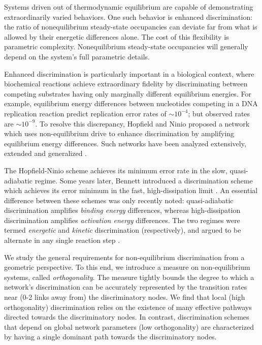 Systems driven out of thermodynamic equilibrium are capable of demonstrating extraordinarily varied behaviors.  One such behavior is enhanced discrimination: the ratio of nonequilibrium steady-state occupancies can deviate far from what is allowed by their energetic differences alone.  The cost of this flexibility is parametric complexity.  Nonequilibrium steady-state occupancies will generally depend on the system's full parametric details.

Enhanced discrimination is particularly important in a biological context, where biochemical reactions achieve extraordinary fidelity by discriminating between competing substrates having only marginally different equilibrium energies.  For example, equilibrium energy differences between nucleotides competing in a DNA replication reaction predict replication error rates of $\sim10^{-4}$; but observed rates are $\sim10^{-9}$.  To resolve this discrepancy, Hopfield \cite{Hopfield1974} and Ninio \cite{Ninio1975} proposed a network which uses non-equilibrium drive to enhance discrimination by amplifying equilibrium energy differences.  Such networks have been analyzed extensively, extended \cite{Ehrenberg1980,Murugan2012} and generalized \cite{Murugan2014}.

The Hopfield-Ninio scheme achieves its minimum error rate in the slow, quasi-adiabatic regime.  Some years later, Bennett introduced a discrimination scheme which achieves its error minimum in the fast, high-dissipation limit \cite{Bennett1979,Bennett1982}.  An essential difference between these schemes was only recently noted: quasi-adiabatic discrimination amplifies {\it binding energy} differences, whereas high-dissipation discrimination amplifies {\it activation energy} differences.  The two regimes were termed {\it energetic} and {\it kinetic} discrimination (respectively), and argued to be alternate in any single reaction step \cite{Sartori2013}.

We study the general requirements for non-equilibrium discrimination from a geometric perspective.  To this end, we introduce a measure on non-equilibrium systems, called {\it orthogonality}. The measure tightly bounds the degree to which a network's discrimination can be accurately represented by the transition rates near (0-2 links away from) the discriminatory nodes.  We find that local (high orthogonality) discrimination relies on the existence of many effective pathways directed towards the discriminatory nodes.  In contrast, discrimination schemes that depend on global network parameters (low orthogonality) are characterized by having a single dominant path towards the discriminatory nodes.

